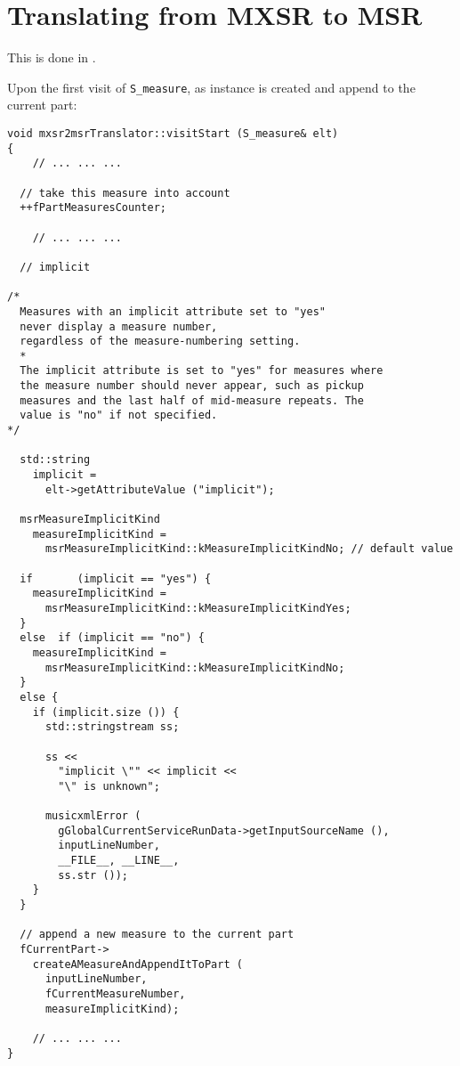 \section{Translating from MXSR to MSR}

This is done in \mxsrToMsr{}.

Upon the first visit of {\tt S_measure}, as  instance is created and append to the current part:
\begin{lstlisting}[language=CPlusPlus]
void mxsr2msrTranslator::visitStart (S_measure& elt)
{
	// ... ... ...

  // take this measure into account
  ++fPartMeasuresCounter;

	// ... ... ...

  // implicit

/*
  Measures with an implicit attribute set to "yes"
  never display a measure number,
  regardless of the measure-numbering setting.
  *
  The implicit attribute is set to "yes" for measures where
  the measure number should never appear, such as pickup
  measures and the last half of mid-measure repeats. The
  value is "no" if not specified.
*/

  std::string
    implicit =
      elt->getAttributeValue ("implicit");

  msrMeasureImplicitKind
    measureImplicitKind =
      msrMeasureImplicitKind::kMeasureImplicitKindNo; // default value

  if       (implicit == "yes") {
    measureImplicitKind =
      msrMeasureImplicitKind::kMeasureImplicitKindYes;
  }
  else  if (implicit == "no") {
    measureImplicitKind =
      msrMeasureImplicitKind::kMeasureImplicitKindNo;
  }
  else {
    if (implicit.size ()) {
      std::stringstream ss;

      ss <<
        "implicit \"" << implicit <<
        "\" is unknown";

      musicxmlError (
        gGlobalCurrentServiceRunData->getInputSourceName (),
        inputLineNumber,
        __FILE__, __LINE__,
        ss.str ());
    }
  }

  // append a new measure to the current part
  fCurrentPart->
    createAMeasureAndAppendItToPart (
      inputLineNumber,
      fCurrentMeasureNumber,
      measureImplicitKind);

	// ... ... ...
}
\end{lstlisting}

